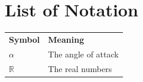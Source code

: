 \documentclass{ctuthesis}
\begin{document}



\appendix
\chapter*{List of Notation}
\noindent
\begin{tabularx}{\linewidth}
  { l >{\raggedright\arraybackslash}X }
\bfseries Symbol & \bfseries Meaning \\\Midrule
$\alpha$ & The angle of attack \\
$\mathbb{R}$ & The real numbers \\
\end{tabularx}
 
\end{document}
